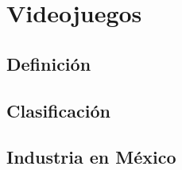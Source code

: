 \section{Videojuegos}
\subsection{Definición}
\subsection{Clasificación}
\subsection{Industria en México}
